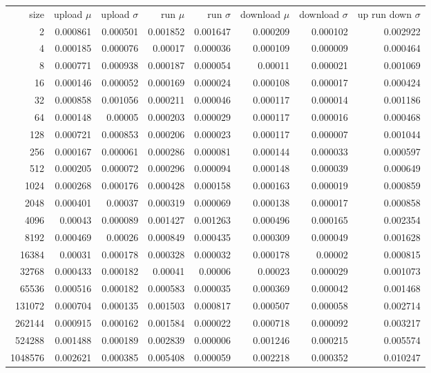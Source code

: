 \begin{tabular}{r r r r r r r r}
size & upload $\mu$  & upload $\sigma$ & run $\mu$ & run $\sigma$ & download $\mu$ & download $\sigma$ & up run down $\sigma$ \\
2 & 0.000861 & 0.000501 & 0.001852 & 0.001647 & 0.000209 & 0.000102 & 0.002922 \\
4 & 0.000185 & 0.000076 & 0.00017 & 0.000036 & 0.000109 & 0.000009 & 0.000464 \\
8 & 0.000771 & 0.000938 & 0.000187 & 0.000054 & 0.00011 & 0.000021 & 0.001069 \\
16 & 0.000146 & 0.000052 & 0.000169 & 0.000024 & 0.000108 & 0.000017 & 0.000424 \\
32 & 0.000858 & 0.001056 & 0.000211 & 0.000046 & 0.000117 & 0.000014 & 0.001186 \\
64 & 0.000148 & 0.00005 & 0.000203 & 0.000029 & 0.000117 & 0.000016 & 0.000468 \\
128 & 0.000721 & 0.000853 & 0.000206 & 0.000023 & 0.000117 & 0.000007 & 0.001044 \\
256 & 0.000167 & 0.000061 & 0.000286 & 0.000081 & 0.000144 & 0.000033 & 0.000597 \\
512 & 0.000205 & 0.000072 & 0.000296 & 0.000094 & 0.000148 & 0.000039 & 0.000649 \\
1024 & 0.000268 & 0.000176 & 0.000428 & 0.000158 & 0.000163 & 0.000019 & 0.000859 \\
2048 & 0.000401 & 0.00037 & 0.000319 & 0.000069 & 0.000138 & 0.000017 & 0.000858 \\
4096 & 0.00043 & 0.000089 & 0.001427 & 0.001263 & 0.000496 & 0.000165 & 0.002354 \\
8192 & 0.000469 & 0.00026 & 0.000849 & 0.000435 & 0.000309 & 0.000049 & 0.001628 \\
16384 & 0.00031 & 0.000178 & 0.000328 & 0.000032 & 0.000178 & 0.00002 & 0.000815 \\
32768 & 0.000433 & 0.000182 & 0.00041 & 0.00006 & 0.00023 & 0.000029 & 0.001073 \\
65536 & 0.000516 & 0.000182 & 0.000583 & 0.000035 & 0.000369 & 0.000042 & 0.001468 \\
131072 & 0.000704 & 0.000135 & 0.001503 & 0.000817 & 0.000507 & 0.000058 & 0.002714 \\
262144 & 0.000915 & 0.000162 & 0.001584 & 0.000022 & 0.000718 & 0.000092 & 0.003217 \\
524288 & 0.001488 & 0.000189 & 0.002839 & 0.000006 & 0.001246 & 0.000215 & 0.005574 \\
1048576 & 0.002621 & 0.000385 & 0.005408 & 0.000059 & 0.002218 & 0.000352 & 0.010247 \\

\end{tabular}
